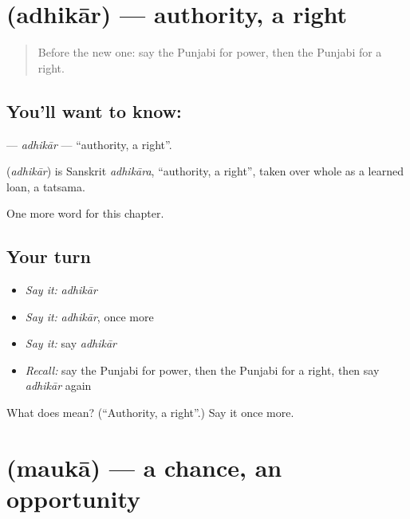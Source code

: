 \section[\texorpdfstring{\pa{ਅਧਿਕਾਰ} (adhikār)}{ਅਧਿਕਾਰ (adhikār)}]{ (adhikār) — authority, a right}

\label{lesson:PA-C110-adhikar}



\begin{quote}
Before the new one: say the Punjabi for power, then the Punjabi for a right.
\end{quote}

\subsection*{You'll want to know: }
\textbf{} — \emph{adhikār} — \textquotedblleft{}authority, a right\textquotedblright{}.

\begin{cousinweb}
\textbf{} (\emph{adhikār}) is Sanskrit \emph{adhikāra}, \textquotedblleft{}authority, a right\textquotedblright{}, taken over whole as a learned loan, a tatsama.
\end{cousinweb}

\begin{grammarlens}[title={What you've built}]
One more word for this chapter.
\end{grammarlens}

\subsection*{Your turn}
\begin{itemize}
\raggedright
  \item \emph{Say it:} \emph{adhikār}
  \item \emph{Say it:} \emph{adhikār}, once more
  \item \emph{Say it:} say \emph{adhikār}
  \item \emph{Recall:} say the Punjabi for power, then the Punjabi for a right, then say \emph{adhikār} again
\end{itemize}

\begin{tcolorbox}[breakable,colback=teal!4,colframe=teal!35!black,title={Before you move on}]
What does  mean? (\textquotedblleft{}Authority, a right\textquotedblright{}.) Say it once more.
\end{tcolorbox}
\section[\texorpdfstring{\pa{ਮੌਕਾ} (maukā)}{ਮੌਕਾ (maukā)}]{ (maukā) — a chance, an opportunity}

